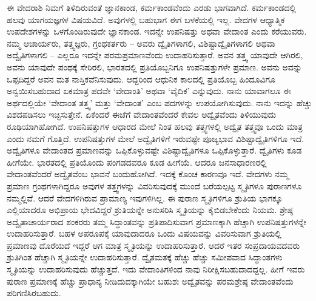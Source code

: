 ಈ ವೇದರಾಶಿ ನಿಮಗೆ ತಿಳಿದಿರುವಂತೆ ಜ್ಞಾನಕಾಂಡ, ಕರ್ಮಕಾಂಡವೆಂದು ಎರಡು ಭಾಗವಾಗಿದೆ. ಕರ್ಮಕಾಂಡದಲ್ಲಿ ಹಲವು ಯಾಗಯಜ್ಞಗಳ ವಿಷಯವಿದೆ. ಅವುಗಳಲ್ಲಿ ಬಹುಭಾಗ ಈಗ ಬಳಕೆಯಲ್ಲಿ ಇಲ್ಲ. ವೇದಗಳ ಆಧ್ಯಾತ್ಮಿಕ ಉಪದೇಶಗಳನ್ನು ಒಳಗೊಂಡಿರುವುದೇ ಜ್ಞಾನಕಾಂಡ. ಇದನ್ನೇ ಉಪನಿಷತ್ತು ಅಥವಾ ವೇದಾಂತ ಎಂದು ಕರೆಯುವರು. ನಮ್ಮ ಆಚಾರ್ಯರು, ತತ್ತ್ವಜ್ಞರು, ಗ್ರಂಥಕರ್ತರು – ಅವರು ದ್ವೈತಿಗಳಾಗಲಿ, ವಿಶಿಷ್ಟಾದ್ವೈತಿಗಳಾಗಲಿ ಅಥವಾ ಅದ್ವೈತಿಗಳಾಗಲಿ – ಎಲ್ಲರೂ ಇದನ್ನೇ ಪರಮಪ್ರಮಾಣವೆಂದು ಉದಾಹರಿಸುತ್ತಾರೆ. ಅವನ ತತ್ತ್ವ ಯಾವುದೇ ಆಗಿರಲಿ, ಅವನು ಯಾವುದೇ ಪಂಥಕ್ಕೆ ಸೇರಿರಲಿ, ಭಾರತದಲ್ಲಿ ಪ್ರತಿಯೊಬ್ಬನಿಗೂ ಉಪನಿಷತ್ತುಗಳೇ ಪ್ರಮಾಣ. ಅವನು ಅವನ್ನು ಒಪ್ಪದಿದ್ದರೆ ಅವನ ಮತ ನಾಸ್ತಿಕವೆನಿಸುವುದು. ಆದ್ದರಿಂದ ಆಧುನಿಕ ಕಾಲದಲ್ಲಿ ಪ್ರತಿಯೊಬ್ಬ ಹಿಂದೂವಿಗೂ ಅನ್ವಯಿಸಬಹುದಾದ ಏಕಮಾತ್ರ ಪದವೇ ‘ವೇದಾಂತಿ’ ಅಥವಾ ‘ವೈದಿಕ’ ಎನ್ನುವುದು. ನಾನು ಯಾವಾಗಲೂ ಈ ಅರ್ಥದಲ್ಲಿಯೇ ‘ವೇದಾಂತ ತತ್ತ್ವ’ ಮತ್ತು ‘ವೇದಾಂತ’ ಎಂಬ ಪದಗಳನ್ನು ಉಪಯೋಗಿಸುವುದು. ನಾನು ಇದನ್ನು ಹೆಚ್ಚು ವಿಶದಪಡಿಸಲು ಇಚ್ಛಿಸುತ್ತೇನೆ. ಏಕೆಂದರೆ ಈಚೆಗೆ ವೇದಾಂತವೆಂದರೆ ಕೇವಲ ಅದ್ವೈತವೆಂದು ತಿಳಿಯುವುದು ರೂಢಿಯಾಗಿಹೋಗಿದೆ. ಉಪನಿಷತ್ತುಗಳ ಆಧಾರದ ಮೇಲೆ ನಿಂತ ಹಲವು ತತ್ತ್ವಗಳಲ್ಲಿ ಅದ್ವೈತ ತತ್ತ್ವವೂ ಒಂದು ಮಾತ್ರ ಎಂದು ನಮಗೆ ಗೊತ್ತಿದೆ. ಉಪನಿಷತ್ತುಗಳ ಮೇಲೆ ಅದ್ವೈತಿಗಳಿಗೆ ಇರುವಷ್ಟೇ ಪೂಜ್ಯಭಾವ ವಿಶಿಷ್ಟಾದ್ವೈತಿಗಳಿಗೂ ಇದೆ. ಅದ್ವೈತಿಗಳೂ ವೇದಾಂತದ ಪ್ರಮಾಣವನ್ನು ಒಪ್ಪಿಕೊಳ್ಳುವಷ್ಟೇ ವಿಶಿಷ್ಟಾದ್ವೈತಿಗಳೂ ಒಪ್ಪಿಕೊಳ್ಳುತ್ತಾರೆ. ದ್ವೈತಿಗಳು ಕೂಡ ಹೀಗೆಯೇ. ಭಾರತದಲ್ಲಿ ಪ್ರತಿಯೊಂದು ಪಂಗಡದವರೂ ಕೂಡ ಹೀಗೆಯೆ. ಆದರೂ ಜನಸಾಧಾರಣರಲ್ಲಿ ವೇದಾಂತವೆಂದರೆ ಅದ್ವೈತವೆಂಬ ಭಾವನೆ ಬಂದುಹೋಗಿದೆ. ಇದಕ್ಕೆ ಕೊಂಚ ಕಾರಣವೂ ಇದೆ. ವೇದಗಳು ನಮ್ಮ ಪ್ರಮಾಣ ಗ್ರಂಥಗಳಾಗಿದ್ದರೂ ಅವುಗಳ ತತ್ತ್ವಗಳನ್ನು ವಿವರಿಸುವುದಕ್ಕೆ ಮುಂದೆ ಬರೆಯಲ್ಪಟ್ಟ ಸ್ಮೃತಿಗಳೂ ಪುರಾಣಗಳೂ ನಮ್ಮಲ್ಲಿವೆ. ಆದರೆ ವೇದಗಳಿಗಿರುವ ಪ್ರಾಮಾಣ್ಯ ಇವುಗಳಿಗಿಲ್ಲ. ಈ ಪುರಾಣ ಸ್ಮೃತಿಗಳಿಗೂ ಶ್ರುತಿಯ ಭಾಗಕ್ಕೂ ಎಲ್ಲಿಯಾದರೂ ಅಭಿಪ್ರಾಯ ಭೇದವಿದ್ದರೆ ಶ್ರುತಿಯನ್ನೇ ಅನುಸರಿಸಿ ಸ್ಮೃತಿಯನ್ನು ಕೈಬಿಡಬೇಕೆಂದು ನಿಯಮ. ಶ್ರೇಷ್ಠ ಅದ್ವೈತಾಚಾರ್ಯರಾದ ಶಂಕರರು ತಮ್ಮ ಸಿದ್ಧಾಂತವನ್ನು ಪ್ರತಿಪಾದಿಸುವಾಗ ಪ್ರಮಾಣಕ್ಕಾಗಿ ಹೆಚ್ಚಾಗಿ ಉಪನಿಷತ್ತು\-ಗಳನ್ನೇ ಉದಾಹರಿಸುತ್ತಾರೆ. ಬಹಳ ಅಪರೂಪಕ್ಕೆ ಯಾವುದಾದರೂ ಒಂದು ವಿಷಯವನ್ನು ವಿವರಿಸುವಾಗ ಶ್ರುತಿಯಲ್ಲಿ ಪ್ರಮಾಣವು ದೊರೆಯದೆ ಇದ್ದರೆ ಆಗ ಮಾತ್ರ ಸ್ಮೃತಿಯನ್ನು ಉದಾಹರಿಸುತ್ತಾರೆ. ಆದರೆ ಇತರ ಸಂಪ್ರದಾಯವದವರು ಶ್ರುತಿಗಿಂತ ಹೆಚ್ಚಾಗಿ ಸ್ಮೃತಿಯನ್ನೇ ಉದಾಹರಿಸುತ್ತಾರೆ. ದ್ವೈತಮತಕ್ಕೆ ಹೆಚ್ಚು ಹೆಚ್ಚು ಸಮೀಪವಾದ ಸಿದ್ಧಾಂತಗಳು ಸ್ಮೃತಿಯನ್ನು ಉದಾಹರಿಸುವುದು ಹೆಚ್ಚುತ್ತದೆ. ಇದು ವೇದಾಂತಿಗಳಿಂದ ನಾವು ನಿರೀಕ್ಷಿಸಬಹುದಾದದ್ದಲ್ಲ. ಹೀಗೆ ಇವರು ಪುರಾಣ ಪ್ರಮಾಣಕ್ಕೆ ಹೆಚ್ಚು ಪ್ರಾಧಾನ್ಯ ನೀಡಿದುದಕ್ಕಾಗಿಯೇ ಬಹುಶಃ ಅದ್ವೈತವನ್ನು ಪರಮಶ್ರೇಷ್ಠ ವೇದಾಂತವೆಂದು ಪರಿಗಣಿಸಿರಬಹುದು.

